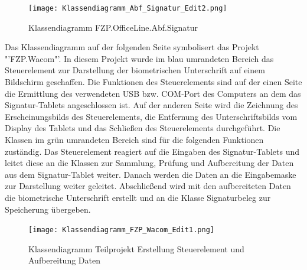 \begin{figure}[!ht]
    \centering
    \texttt{[image: Klassendiagramm\_Abf\_Signatur\_Edit2.png]}
    \caption[Klassendiagramm FZP.OfficeLine.Abf.Signatur]{\small{Klassendiagramm FZP.OfficeLine.Abf.Signatur}}
\end{figure}
\newline
\pagebreak
\textbf{} %
\newline
Das Klassendiagramm auf der folgenden Seite symbolisert das Projekt "'FZP.Wacom"'. In diesem Projekt wurde im blau umrandeten Bereich das Steuerelement zur Darstellung der biometrischen Unterschrift auf einem Bildschirm geschaffen. Die Funktionen des Steuerelements sind auf der einen Seite die Ermittlung des verwendeten USB bzw. COM-Port des Computers an dem das Signatur-Tablets angeschlossen ist. Auf der anderen Seite wird die Zeichnung des Erscheinungsbilds des Steuerelements, die Entfernung des Unterschriftsbilds vom Display des Tablets und das Schließen des Steuerelements durchgeführt. Die Klassen im grün umrandeten Bereich sind für die folgenden Funktionen zuständig. Das Steuerelement reagiert auf die Eingaben des Signatur-Tablets und leitet diese an die Klassen zur Sammlung, Prüfung und Aufbereitung der Daten aus dem Signatur-Tablet weiter. Danach werden die Daten an die Eingabemaske zur Darstellung weiter geleitet. Abschließend wird mit den aufbereiteten Daten die biometrische Unterschrift erstellt und an die Klasse Signaturbeleg zur Speicherung übergeben.
\begin{figure}[!ht]
    \centering
    \texttt{[image: Klassendiagramm\_FZP\_Wacom\_Edit1.png]}
    \caption[Klassendiagramm Erstellung Steuerelement und Aufbereitung Daten]{\small{Klassendiagramm Teilprojekt Erstellung Steuerelement und Aufbereitung Daten}}
\end{figure}
\newline
\pagebreak
\textbf{} %
\newline
